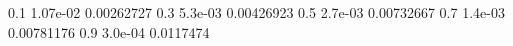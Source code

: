 0.1 1.07e-02 0.00262727
0.3 5.3e-03 0.00426923
0.5 2.7e-03 0.00732667
0.7 1.4e-03 0.00781176
0.9 3.0e-04 0.0117474